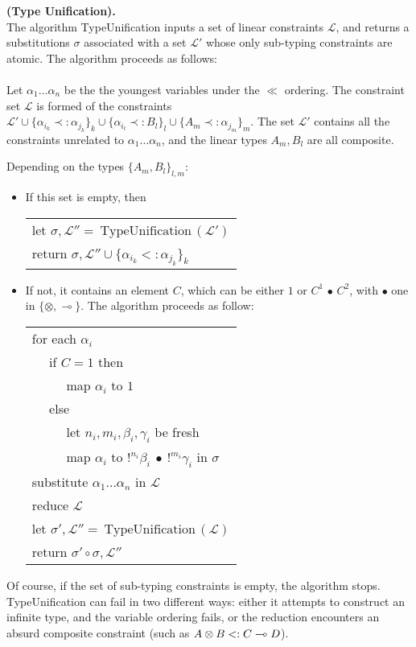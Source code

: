 \begin{algorithm}{\bf (Type Unification).}\label{alg-type-uni}
 \\
	The algorithm TypeUnification inputs a set of linear constraints $\mathcal{L}$, and returns
	a substitutions $\sigma$ associated with a set $\mathcal{L'}$ whose only sub-typing constraints are atomic.
	The algorithm proceeds as follows: \\
	\\
  Let $\alpha_1 \dots \alpha_n$ be the the youngest variables under the $\ll$ ordering. The constraint set $\mathcal{L}$ is formed of the constraints
  $\mathcal{L'} \cup \{ \alpha_{i_k} \prec: \alpha_{j_k} \}_k \cup \{ \alpha_{i_l} \prec: B_l \}_l
	\cup \{ A_m \prec: \alpha_{j_m} \}_m$.
  The set $\mathcal{L'}$ contains all the constraints unrelated to $\alpha_1 \dots \alpha_n$,
  and the linear types $A_m, B_l$ are all composite.
  		
  Depending on the types $\{A_m, B_l\}_{l, m}$:
	\begin{itemize}
		\item If this set is empty, then \\
			\begin{tabular}{l}
				let $\sigma, \mathcal{L''} = ~\text{TypeUnification}\,(\mathcal{L'})$ \\
				return $\sigma, \mathcal{L''} \cup \{ \alpha_{i_k} <: \alpha_{j_k} \}_k$
			\end{tabular}
	  
	  \item If not, it contains an element $C$, which can be either $1$ or $C^1 \,\bullet \, C^2$, with $\bullet$ one in $\{ \otimes, \multimap \}$.
		  The algorithm proceeds as follow:\\
	  	\begin{tabular}{l}
	  		for each $\alpha_i$ \\
	  		~~ if $C = 1$ then \\
	  		~~ ~~ map $\alpha_i$ to $1$ \\
	  		~~ else \\
	  		~~ ~~ let $n_i, m_i, \beta_i, \gamma_i$ be fresh \\
	  		~~ ~~ map $\alpha_i$ to $!^{n_i} \beta_i ~\bullet~ !^{m_i}\gamma_i$ in $\sigma$ \\
	  		substitute $\alpha_1 \dots \alpha_n$ in $\mathcal{L}$ \\
	  		reduce $\mathcal{L}$ \\
	  		let $\sigma', \mathcal{L''} = ~\text{TypeUnification}\,(\mathcal{L})$ \\
	  		return $\sigma' \circ \sigma, \mathcal{L''}$
	  	\end{tabular}
  \end{itemize}

  Of course, if the set of sub-typing constraints is empty, the algorithm stops.
  TypeUnification can fail in two different ways: either it attempts to construct an infinite
  type, and the variable ordering fails, or the reduction encounters an absurd composite constraint (such as $A\otimes B <: C\multimap D$).
\end{algorithm}

